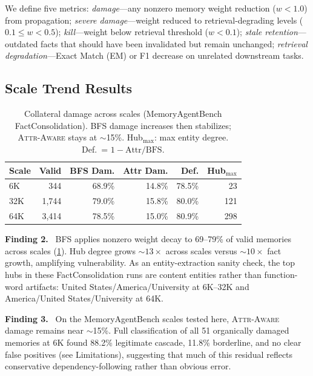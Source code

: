\documentclass{article}
\newcommand{\attraware}{\textsc{Attr-Aware}}
\newcommand{\finding}[1]{\vspace{2pt}\noindent\textbf{Finding #1.}~}
\begin{document}
We define five metrics:
\textit{damage}---any nonzero memory weight reduction ($w < 1.0$) from propagation;
\textit{severe damage}---weight reduced to retrieval-degrading levels ($0.1 \leq w < 0.5$);
\textit{kill}---weight below retrieval threshold ($w < 0.1$);
\textit{stale retention}---outdated facts that should have been invalidated but remain unchanged;
\textit{retrieval degradation}---Exact Match (EM) or F1 decrease on unrelated downstream tasks.

\subsection{Scale Trend Results}

\begin{table}[htbp]
\centering
\footnotesize
\setlength{\tabcolsep}{3pt}
\begin{tabular}{lrrrrr}
\toprule
\textbf{Scale} & \textbf{Valid} & \textbf{BFS Dam.} & \textbf{Attr Dam.} & \textbf{Def.} & \textbf{Hub$_{\max}$} \\
\midrule
6K   & 344   & 68.9\% & 14.8\% & 78.5\% & 23 \\
32K  & 1,744 & 79.0\% & 15.8\% & 80.0\% & 121 \\
64K  & 3,414 & 78.5\% & 15.0\% & 80.9\% & 298 \\
\bottomrule
\end{tabular}
\caption{Collateral damage across scales (MemoryAgentBench FactConsolidation). BFS damage increases then stabilizes; \attraware{} stays at ${\sim}$15\%. Hub$_{\max}$: max entity degree. Def.\ = $1 - \text{Attr}/\text{BFS}$.}
\label{tab:scale}
\end{table}

\finding{2} BFS applies nonzero weight decay to 69--79\% of valid memories across scales (\cref{tab:scale}).
Hub degree grows ${\sim}13\times$ across scales versus ${\sim}10\times$ fact growth, amplifying vulnerability.
As an entity-extraction sanity check, the top hubs in these FactConsolidation runs are content entities rather than function-word artifacts: United States/America/University at 6K--32K and America/United States/University at 64K.

\finding{3} On the MemoryAgentBench scales tested here, \attraware{} damage remains near ${\sim}$15\%.
Full classification of all 51 organically damaged memories at 6K found 88.2\% legitimate cascade, 11.8\% borderline, and no clear false positives (see Limitations), suggesting that much of this residual reflects conservative dependency-following rather than obvious error.
\end{document}
